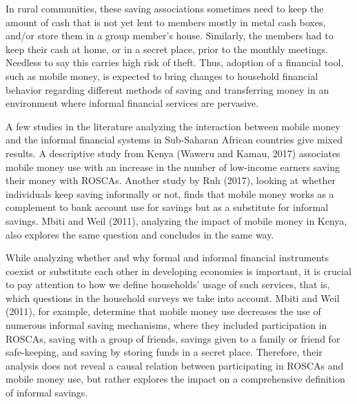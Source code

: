 \documentclass[11pt]{article}
\numberwithin{equation}{section}
\begin{document}
In rural communities, these saving associations sometimes need to keep the amount of cash that is not yet lent to members mostly in metal cash boxes, and/or store them in a group member's house. Similarly, the members had to keep their cash at home, or in a secret place, prior to the monthly meetings. Needless to say this carries high risk of theft. Thus, adoption of a financial tool, such as mobile money, is expected to bring changes to household financial behavior regarding different methods of saving and transferring money in an environment where informal financial services are pervasive.

A few studies in the literature analyzing the interaction between mobile money and the informal financial systems in Sub-Saharan African countries give mixed results. A descriptive study from Kenya (Waweru and Kamau, 2017) associates mobile money use with an increase in the number of low-income earners saving their money with ROSCAs. Another study by Ruh (2017), looking at whether individuals keep saving informally or not, finds that mobile money works as a complement to bank account use for savings but as a substitute for informal savings. Mbiti and Weil (2011), analyzing the impact of mobile money in Kenya, also explores the same question and concludes in the same way. 

While analyzing whether and why formal and informal financial instruments coexist or substitute each other in developing economies is important, it is crucial to pay attention to how we define households' usage of such services, that is, which questions in the household surveys we take into account. Mbiti and Weil (2011), for example, determine that mobile money use decreases the use of numerous informal saving mechanisms, where they included participation in ROSCAs, saving with a group of friends, savings given to a family or friend for safe-keeping, and saving by storing funds in a secret place. Therefore, their analysis does not reveal a causal relation between participating in ROSCAs and mobile money use, but rather explores the impact on a comprehensive definition of informal savings.
\end{document}

